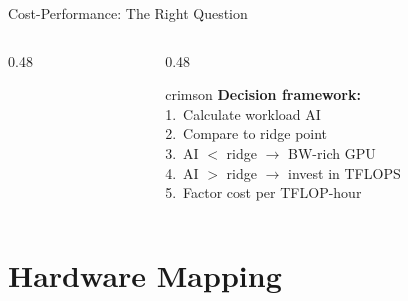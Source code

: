 \documentclass[aspectratio=169, 12pt]{beamer}
\begin{document}
\begin{frame}{Cost-Performance: The Right Question}
\begin{columns}[T]
\begin{column}{0.48\textwidth}
    \vspace{0.15cm}
    {\footnotesize{}}
  \end{column}
  \begin{column}{0.48\textwidth}
    \begin{mlsyscard}{crimson}
    {\scriptsize \textbf{Decision framework:}\\[0.05cm]
    1.\ Calculate workload AI\\
    2.\ Compare to ridge point\\
    3.\ AI $<$ ridge $\to$ BW-rich GPU\\
    4.\ AI $>$ ridge $\to$ invest in TFLOPS\\
    5.\ Factor cost per TFLOP-hour
    }
    \end{mlsyscard}
  \end{column}
\end{columns}

\end{frame}

\section{Hardware Mapping}
\end{document}
